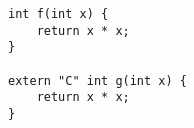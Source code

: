\begin{lstlisting}[title=\href{https://godbolt.org/z/cj7bqx}{\texttt{godbolt.org/z/cj7bqx}}]
int f(int x) {
    return x * x;
}

extern "C" int g(int x) {
    return x * x;
}
\end{lstlisting}
